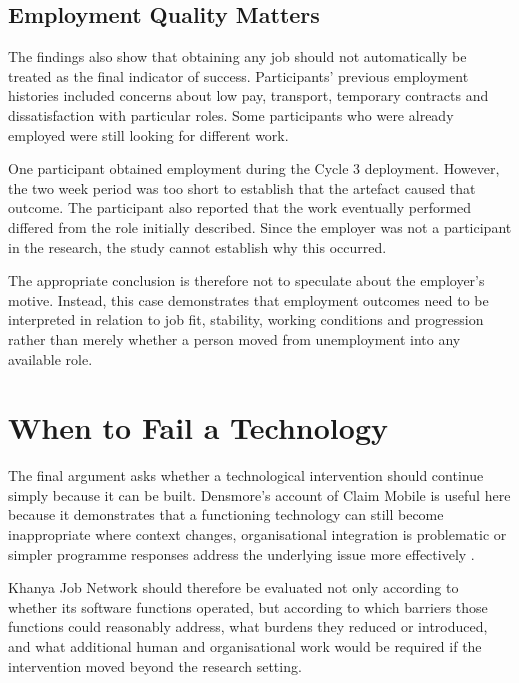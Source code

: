 \subsection{Employment Quality Matters}
\label{sec:employment-quality}

The findings also show that obtaining any job should not automatically be treated as the final indicator of success. Participants' previous employment histories included concerns about low pay, transport, temporary contracts and dissatisfaction with particular roles. Some participants who were already employed were still looking for different work.

One participant obtained employment during the Cycle 3 deployment. However, the two week period was too short to establish that the artefact caused that outcome. The participant also reported that the work eventually performed differed from the role initially described. Since the employer was not a participant in the research, the study cannot establish why this occurred.

The appropriate conclusion is therefore not to speculate about the employer's motive. Instead, this case demonstrates that employment outcomes need to be interpreted in relation to job fit, stability, working conditions and progression rather than merely whether a person moved from unemployment into any available role.


\section{When to Fail a Technology}

The final argument asks whether a technological intervention should continue simply because it can be built. Densmore's account of Claim Mobile is useful here because it demonstrates that a functioning technology can still become inappropriate where context changes, organisational integration is problematic or simpler programme responses address the underlying issue more effectively \cite{densmore2012}.

Khanya Job Network should therefore be evaluated not only according to whether its software functions operated, but according to which barriers those functions could reasonably address, what burdens they reduced or introduced, and what additional human and organisational work would be required if the intervention moved beyond the research setting.



